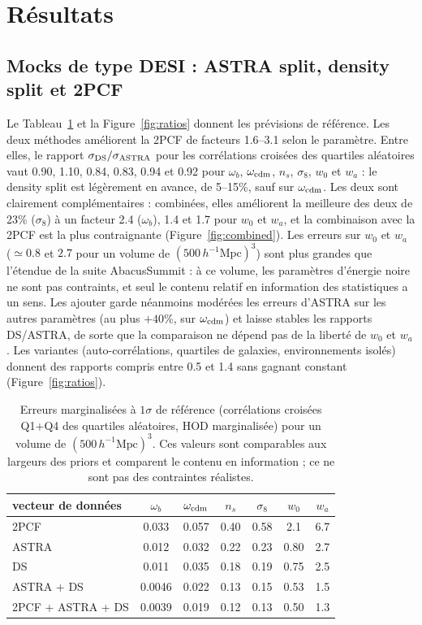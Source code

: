 \documentclass[11pt,twocolumn]{article}
\newcommand{\Mpch}{\,h^{-1}\mathrm{Mpc}}
\begin{document}
\section{Résultats}
\label{sec:results}

\subsection{Mocks de type DESI : ASTRA split, density split et 2PCF}

Le Tableau~\ref{tab:sigma} et la Figure~\ref{fig:ratios} donnent les prévisions de référence. Les deux méthodes améliorent la 2PCF de facteurs 1.6--3.1 selon le paramètre. Entre elles, le rapport $\sigma_{\rm DS}/\sigma_{\rm ASTRA}$ pour les corrélations croisées des quartiles aléatoires vaut 0.90, 1.10, 0.84, 0.83, 0.94 et 0.92 pour $\omega_b$, $\omega_{\rm cdm}$, $n_s$, $\sigma_8$, $w_0$ et $w_a$ : le density split est légèrement en avance, de 5--15\%, sauf sur $\omega_{\rm cdm}$. Les deux sont clairement complémentaires : combinées, elles améliorent la meilleure des deux de 23\% ($\sigma_8$) à un facteur 2.4 ($\omega_b$), 1.4 et 1.7 pour $w_0$ et $w_a$, et la combinaison avec la 2PCF est la plus contraignante (Figure~\ref{fig:combined}). Les erreurs sur $w_0$ et $w_a$ ($\simeq0.8$ et $2.7$ pour un volume de $(500\Mpch)^3$) sont plus grandes que l'étendue de la suite AbacusSummit : à ce volume, les paramètres d'énergie noire ne sont pas contraints, et seul le contenu relatif en information des statistiques a un sens. Les ajouter garde néanmoins modérées les erreurs d'ASTRA sur les autres paramètres (au plus $+40\%$, sur $\omega_{\rm cdm}$) et laisse stables les rapports DS/ASTRA, de sorte que la comparaison ne dépend pas de la liberté de $w_0$ et $w_a$. Les variantes (auto-corrélations, quartiles de galaxies, environnements isolés) donnent des rapports compris entre 0.5 et 1.4 sans gagnant constant (Figure~\ref{fig:ratios}).

\begin{table}[!htbp]
\centering\small
\begin{tabular}{lcccccc}
\toprule
vecteur de données & $\omega_b$ & $\omega_{\rm cdm}$ & $n_s$ & $\sigma_8$ & $w_0$ & $w_a$ \\
\midrule
2PCF & 0.033 & 0.057 & 0.40 & 0.58 & 2.1 & 6.7 \\
ASTRA & 0.012 & 0.032 & 0.22 & 0.23 & 0.80 & 2.7 \\
DS & 0.011 & 0.035 & 0.18 & 0.19 & 0.75 & 2.5 \\
ASTRA + DS & 0.0046 & 0.022 & 0.13 & 0.15 & 0.53 & 1.5 \\
2PCF + ASTRA + DS & 0.0039 & 0.019 & 0.12 & 0.13 & 0.50 & 1.3 \\
\bottomrule
\end{tabular}
\caption{Erreurs marginalisées à $1\sigma$ de référence (corrélations croisées Q1+Q4 des quartiles aléatoires, HOD marginalisée) pour un volume de $(500\Mpch)^3$. Ces valeurs sont comparables aux largeurs des priors et comparent le contenu en information ; ce ne sont pas des contraintes réalistes.}
\label{tab:sigma}
\end{table}
\end{document}
